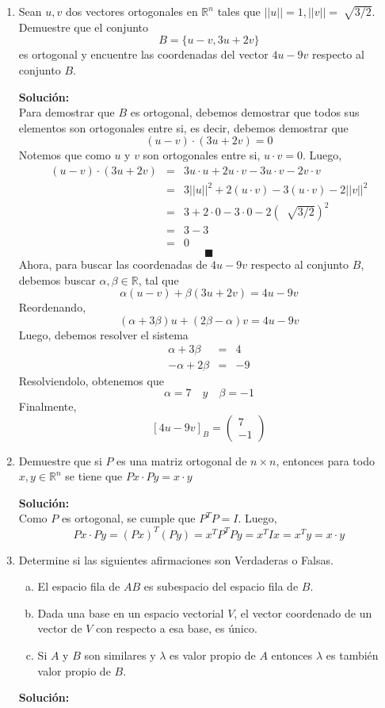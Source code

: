 \documentclass[12pt]{article}
\newenvironment{solucion}
{\begin{mdframed}[backgroundcolor=black!10]
		{\bf Solución:}\\
	}
	{
	\end{mdframed}
}
\newenvironment{preguntas}
{\begin{enumerate}\itemsep12pt
	}
	{
	\end{enumerate}
}
\newcommand{\R}{\mathbb{R}}
\begin{document}
\begin{preguntas}
\item Sean $u, v$ dos vectores ortogonales en $\R^n$ tales que $||u|| = 1, ||v|| = \sqrt[]{3/2}$. Demuestre que el conjunto 
	$$B = \{u-v, 3u+2v\}$$
	es ortogonal y encuentre las coordenadas del vector $4u - 9v$ respecto al conjunto $B$.
\begin{solucion}
Para demostrar que $B$ es ortogonal, debemos demostrar que todos sus elementos son ortogonales entre si, es decir, debemos demostrar que
		$$(u-v) \cdot (3u+2v) = 0$$
		Notemos que como $u$ y $v$ son ortogonales entre si, $u \cdot v = 0$. Luego,
		$$\begin{array}{rcl}
		(u-v) \cdot (3u+2v) & = & 3u \cdot u + 2 u \cdot v - 3u \cdot v - 2v \cdot v\\
		& = & 3||u||^2 + 2 (u \cdot v) - 3(u \cdot v) - 2||v||^2 \\
		& = & 3 + 2 \cdot 0 - 3 \cdot 0 - 2(\ \sqrt[]{3/2})^2 \\
		& = & 3 - 3 \\
		& = & 0
		\end{array}$$
		$$\blacksquare$$
		Ahora, para buscar las coordenadas de $4u - 9v$ respecto al conjunto $B$, debemos buscar $\alpha, \beta \in \R$, tal que
		$$\alpha(u-v) + \beta(3u+2v) = 4u-9v$$
		Reordenando,
		$$(\alpha+3\beta)u + (2\beta -\alpha)v= 4u -9v$$
		Luego, debemos resolver el sistema
		$$\begin{array}{rcl}
		\alpha+3\beta & = & 4\\
		-\alpha+2\beta & = & -9
		\end{array}$$
		Resolviendolo, obtenemos que
		$$\alpha = 7 \quad y \quad \beta = -1$$
		Finalmente,
		$$[4u-9v]_B = \begin{pmatrix}
		7 \\ -1
		\end{pmatrix}$$
\end{solucion}
\item Demuestre que si $P$ es una matriz ortogonal de  $n \times n$, entonces para todo $x, y \in \R^n$ se tiene que $Px \cdot Py = x \cdot y$
\begin{solucion}
Como $P$ es ortogonal, se cumple que $P^TP = I$. Luego,
		$$Px \cdot Py = (Px)^T(Py) = x^TP^TPy = x^TIx= x^Ty = x \cdot y$$
\end{solucion}
\item Determine si las siguientes afirmaciones son Verdaderas o Falsas.
\begin{enumerate}[a)]
\item El espacio fila de $AB$ es subespacio del espacio fila de $B$.
\item Dada una base en un espacio vectorial $V$, el vector coordenado de un vector de $V$ con respecto a esa base, es único.
\item Si $A$ y $B$ son similares y $\lambda$ es valor propio de $A$ entonces $\lambda$ es también valor propio de $B$.
\end{enumerate}
\begin{solucion}


\end{solucion}
\end{preguntas}
\end{document}
